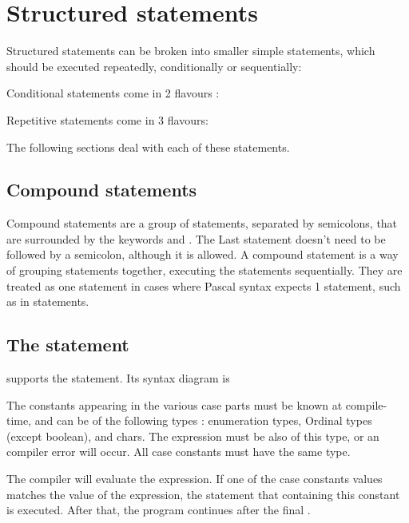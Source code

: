 \documentclass{report}
\begin{document}
\section{Structured statements}

Structured statements can be broken into smaller simple statements, which
should be executed repeatedly, conditionally  or sequentially:



Conditional statements come in 2 flavours : 



Repetitive statements come in 3 flavours:



The following sections deal with each of these statements.

\subsection{Compound statements}
Compound statements are a group of statements, separated by semicolons,
that are surrounded by the keywords  and . The
Last statement doesn't need to be followed by a semicolon, although it is
allowed. A compound statement is a way of grouping statements together, 
executing the statements sequentially. They are treated as one statement 
in cases where Pascal syntax expects 1 statement, such as in 
 statements.



\subsection{The  statement}
\fpc supports the  statement. Its syntax diagram is



The constants appearing in the various case parts must be known at 
compile-time, and can be of the following types : enumeration types, 
Ordinal types (except boolean), and chars. The expression must be also of
this type, or an compiler error will occur. All case constants must 
have the same type.

The compiler will evaluate the expression. If one of the case constants
values matches the value of the expression, the statement that containing
this constant is executed. After that, the program continues after the final
.
\end{document}
